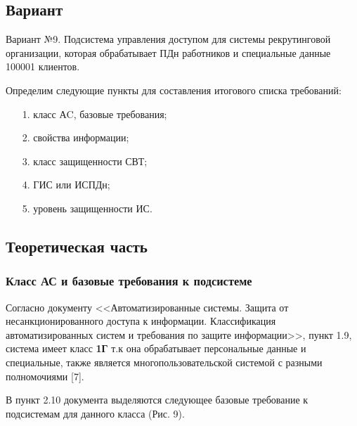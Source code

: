 \subsection{Вариант}
Вариант №9. Подсистема управления доступом для системы рекрутинговой организации, которая 
обрабатывает ПДн работников и специальные данные 100001 клиентов. 

Определим следующие пункты для составления итогового списка требований:
\begin{itemize}
  \item[1.] класс АC, базовые требования;
  \item[2.] свойства информации;
  \item[3.] класс защищенности СВТ;
  \item[4.] ГИС или ИСПДн; 
  \item[5.] уровень защищенности ИС.
\end{itemize}

 

\subsection{Теоретическая часть}
\subsubsection{Класс АС и базовые требования к подсистеме}
Согласно документу <<Автоматизированные системы. Защита от несанкционированного
доступа к информации. Классификация автоматизированных систем
и требования по защите информации>>, пункт 1.9, система  имеет класс \textbf{1Г} т.к она 
обрабатывает персональные данные и специальные, также является многопользовательской системой с разными полномочиями [7].

В пункт 2.10 документа выделяются следующее базовые требование к подсистемам для данного класса (Рис. 9).

